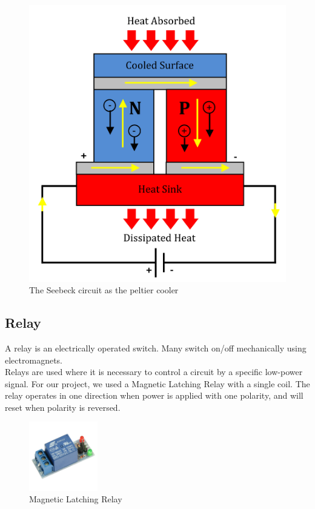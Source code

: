 \documentclass[12pt,onecolumn]{article}
\begin{document}
\begin{figure}[H]
	\centering
	\includegraphics[scale=1.4]{peltier_effect}
	\caption{The Seebeck circuit as the peltier cooler}
\end{figure}


\subsection{Relay}
A relay is an electrically operated switch. Many switch on/off
mechanically using electromagnets.\\
Relays are used where it is necessary to control a circuit by a specific
low-power signal. For our project, we used a Magnetic Latching Relay
with a single coil. The relay operates in one direction when power is
applied with one polarity, and will reset when polarity is reversed.
\begin{figure}[H]
\centering
\includegraphics[width=3cm]{relay}
\caption{Magnetic Latching Relay}
\end{figure}
\end{document}
